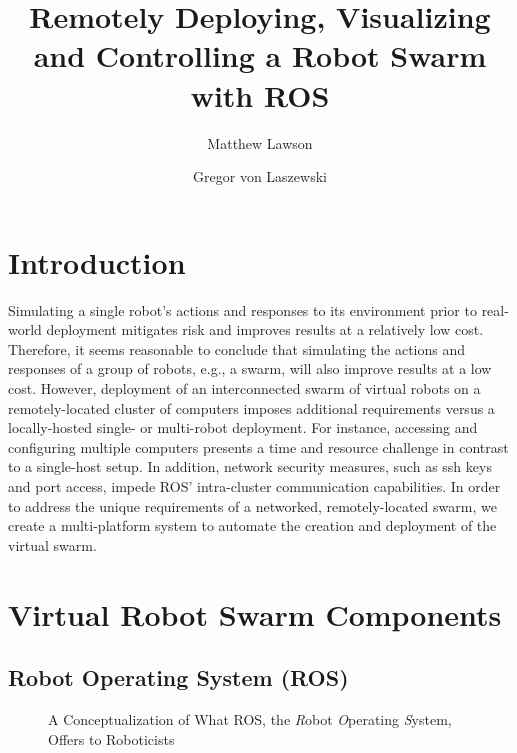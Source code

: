 \documentclass[9pt,twocolumn,twoside]{../../styles/osajnl}
\title{Remotely Deploying, Visualizing and Controlling a Robot Swarm with ROS}
\author[1]{Matthew Lawson}
\author[1,*]{Gregor von Laszewski}
\affil[1]{School of Informatics and Computing, Bloomington, IN 47408, U.S.A.}
\affil[*]{Corresponding authors: laszewski@gmail.com}
\begin{document}
\maketitle

\section{Introduction}
Simulating a single robot's actions and responses to its environment prior to real-world deployment mitigates risk and improves results at a relatively low cost. Therefore, it seems reasonable to conclude that simulating the actions and responses of a group of robots, e.g., a swarm, will also improve results at a low cost.  However, deployment of an interconnected swarm of virtual robots on a remotely-located cluster of computers imposes additional requirements versus a locally-hosted single- or multi-robot deployment.  For instance, accessing and configuring multiple computers presents a time and resource challenge in contrast to a single-host setup.  In addition, network security measures, such as ssh keys and port access, impede ROS' intra-cluster communication capabilities.  In order to address the unique requirements of a networked, remotely-located swarm, we create a multi-platform system to automate the creation and deployment of the virtual swarm. 

\section{Virtual Robot Swarm Components}

\subsection{Robot Operating System (ROS)} %

\begin{figure}[htbp]
\centering
{}
\caption{A Conceptualization of What ROS, the \textit{R}obot \textit{O}perating \textit{S}ystem, Offers to Roboticists \cite{www-ros-ros-is}}
\label{fig:rosOverview}
\end{figure}
\end{document}
